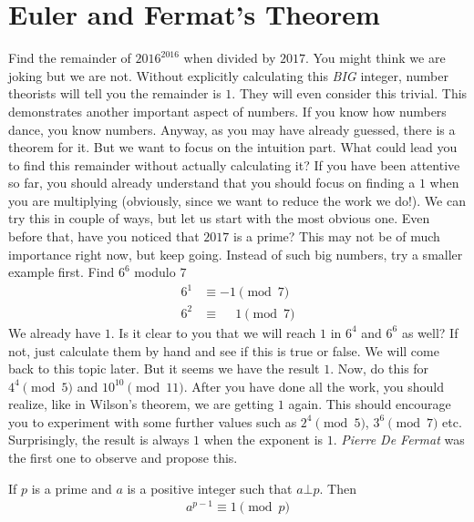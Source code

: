\documentclass{subfile}
\begin{document}
	\section{Euler and Fermat's Theorem}
	Find the remainder of $2016^{2016}$ when divided by $2017$. You might think we are joking but we are not. Without explicitly calculating this \textit{BIG} integer, number theorists will tell you the remainder is $1$. They will even consider this trivial. This demonstrates another important aspect of numbers. If you know how numbers dance, you know numbers. Anyway, as you may have already guessed, there is a theorem for it. But we want to focus on the intuition part. What could lead you to find this remainder without actually calculating it? If you have been attentive so far, you should already understand that you should focus on finding a $1$ when you are multiplying (obviously, since we want to reduce the work we do!). We can try this in couple of ways, but let us start with the most obvious one. Even before that, have you noticed that $2017$ is a prime? This may not be of much importance right now, but keep going. Instead of such big numbers, try a smaller example first. Find $6^6$ modulo $7$
		\begin{align*}
			6^1 & \equiv -1\pmod7\\
			6^2 & \equiv \phantom{-}1\pmod7
		\end{align*}
	We already have $1$. Is it clear to you that we will reach $1$ in $6^4$ and $6^6$ as well? If not, just calculate them by hand and see if this is true or false. We will come back to this topic later. But it seems we have the result $1$. Now, do this for $4^4\pmod5$ and $10^{10}\pmod{11}$. After you have done all the work, you should realize, like in Wilson's theorem, we are getting $1$ again. This should encourage you to experiment with some further values such as $2^4\pmod5$, $3^6\pmod7$ etc. Surprisingly, the result is always $1$ when the exponent is $1$. \textit{Pierre De Fermat} was the first one to observe and propose this.
		\begin{theorem}
			If $p$ is a prime and $a$ is a positive integer such that $a \bot p$. Then
			\begin{align*}
				a^{p-1} \equiv 1 \pmod p
			\end{align*}
		\end{theorem}
\end{document}
